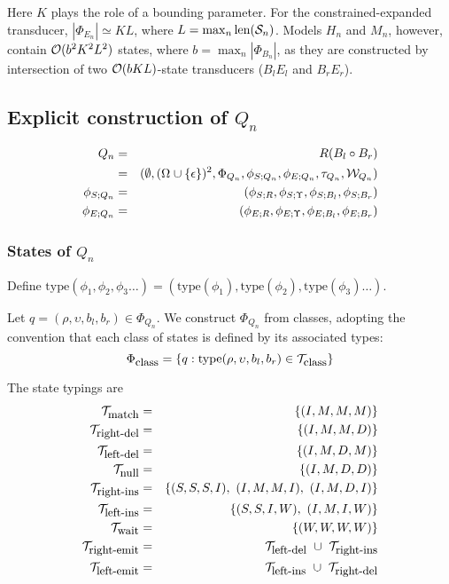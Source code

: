 \documentclass{article}
\newcommand{\seclabel}[1]{\label{sec.#1}}
\newcommand\gappedalphabet[1]{(\Omega_{#1} \cup \{\epsilon\})}
\newcommand\gapsquared{\gappedalphabet{}^2}
\newcommand\compose{}
\newcommand\fork{\circ}
\newcommand\idfork{\Upsilon}
\newcommand\States{\Phi}
\newcommand\statesof[1]{\States_{#1}}
\newcommand\Transitions{\tau}
\newcommand\transitionsof[1]{\Transitions_{#1}}
\newcommand\startstateof[1]{\phi_{S;#1}}
\newcommand\laststateof[1]{\phi_{E;#1}}
\newcommand\weight{{\cal W}}
\newcommand\weightfunof[1]{\weight_{#1}}
\newcommand\numberofstates[1]{|\statesof{#1}|}
\newcommand\statetype{\mbox{type}}
\newcommand\seqlen[1]{\mbox{len}(#1)}
\newcommand\outputn[1]{{\cal S}_{#1}}
\newcommand\outseqlen[1]{\seqlen{\outputn{#1}}}
\newcommand\order[1]{{\cal O}(#1)}
\newcommand\typeset[1]{{\cal T}_{\mbox{\small #1}}}
\newcommand\stateset[1]{\statesof{\mbox{\small #1}}}
\newcommand\qstate{(\rho,\upsilon,b_l,b_r)}
\newcommand\matchsuffix{match}
\newcommand\nullsuffix{null}
\newcommand\leftinsertsuffix{left-ins}
\newcommand\rightinsertsuffix{right-ins}
\newcommand\leftdeletesuffix{left-del}
\newcommand\rightdeletesuffix{right-del}
\newcommand\leftemitsuffix{left-emit}
\newcommand\rightemitsuffix{right-emit}
\newcommand\qwaitsuffix{wait}
\newcommand\matchtypes{\typeset{\matchsuffix}}
\newcommand\nulltypes{\typeset{\nullsuffix}}
\newcommand\leftinserttypes{\typeset{\leftinsertsuffix}}
\newcommand\rightinserttypes{\typeset{\rightinsertsuffix}}
\newcommand\leftdeletetypes{\typeset{\leftdeletesuffix}}
\newcommand\rightdeletetypes{\typeset{\rightdeletesuffix}}
\newcommand\leftemittypes{\typeset{\leftemitsuffix}}
\newcommand\rightemittypes{\typeset{\rightemitsuffix}}
\newcommand\qwaittypes{\typeset{\qwaitsuffix}}
\begin{document}
Here $K$ plays the role of a bounding parameter.
For the constrained-expanded transducer, $\numberofstates{E_n} \simeq KL$, where $L = \max_n \outseqlen{n}$.
Models $H_n$ and $M_n$, however, contain $\order{b^2 K^2 L^2}$ states,
where $b = \max_n \numberofstates{B_n}$,
as they are constructed by intersection of two $\order{bKL}$-state transducers ($B_l \compose E_l$ and $B_r \compose E_r$).

\subsection{Explicit construction of $Q_n$}
\seclabel{Qn}
\begin{eqnarray*}
Q_n & = & R \compose (B_l \fork B_r) \\
& = & (\emptyset,\gapsquared,\statesof{Q_n},\startstateof{Q_n},\laststateof{Q_n},\transitionsof{Q_n},\weightfunof{Q_n}) \\
\startstateof{Q_n} & = & (\startstateof{R},\startstateof{\idfork},\startstateof{B_l},\startstateof{B_r}) \\
\laststateof{Q_n} & = & (\laststateof{R},\laststateof{\idfork},\laststateof{B_l},\laststateof{B_r})
\end{eqnarray*}

\subsubsection{States of $Q_n$}

Define $\statetype(\phi_1,\phi_2,\phi_3 \ldots) = (\statetype(\phi_1), \statetype(\phi_2), \statetype(\phi_3) \ldots)$.

Let $q=\qstate\in\statesof{Q_n}$.
We construct $\statesof{Q_n}$ from classes, adopting the convention that each class of states is defined by its associated types:
\[
\stateset{class} = \{ q: \statetype\qstate \in \typeset{class} \}
\]

The state typings are
\begin{eqnarray*}
\matchtypes & = & \{ (I,M,M,M) \}  \\
\rightdeletetypes & = & \{ (I,M,M,D) \}  \\
\leftdeletetypes & = & \{ (I,M,D,M) \}  \\
\nulltypes & = & \{ (I,M,D,D) \}  \\
\rightinserttypes & = & \{ (S,S,S,I),\ (I,M,M,I),\ (I,M,D,I) \}  \\
\leftinserttypes & = & \{ (S,S,I,W),\ (I,M,I,W) \}  \\
\qwaittypes & = & \{ (W,W,W,W) \} \\
\rightemittypes & = & \leftdeletetypes\ \cup\ \rightinserttypes \\
\leftemittypes & = & \leftinserttypes\ \cup\ \rightdeletetypes
\end{eqnarray*}
\end{document}
